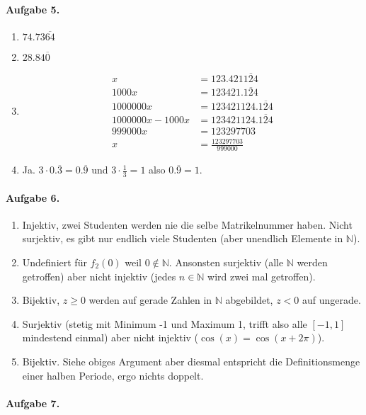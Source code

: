 \documentclass{article}
\begin{document}
\paragraph{Aufgabe 5.}
\begin{enumerate}
    \item $74.73\overline{64}$
    \item $28.84\overline{0}$
    \item \begin{align*}
        x &= 123.421\overline{124} \\
        1000x &= 123421.\overline{124} \\
        1000000x &= 123421124.\overline{124} \\
        1000000x - 1000x &= 123421124.\overline{124} \\
        999000x &= 123297703 \\
        x &= \frac{123297703}{999000}
    \end{align*}
    \item Ja. $3 \cdot 0.\overline{3} = 0.\overline{9}$ und $3 \cdot \frac{1}{3} = 1$ also $0.\overline{9} = 1$.
\end{enumerate}

\paragraph{Aufgabe 6.} \begin{enumerate}
    \item Injektiv, zwei Studenten werden nie die selbe Matrikelnummer haben. Nicht surjektiv, es gibt nur endlich viele Studenten (aber unendlich Elemente in $\mathbb{N}$).
    \item Undefiniert für $f_2(0)$ weil $0 \not\in \mathbb{N}$. Ansonsten surjektiv (alle $\mathbb{N}$ werden getroffen) aber nicht injektiv (jedes $n \in \mathbb{N}$ wird zwei mal getroffen).
    \item Bijektiv, $z \geq 0$ werden auf gerade Zahlen in $\mathbb{N}$ abgebildet, $z < 0$ auf ungerade.
    \item Surjektiv (stetig mit Minimum -1 und Maximum 1, trifft also alle $[-1, 1]$ mindestend einmal) aber nicht injektiv ($\cos(x) = \cos(x + 2\pi)$).
    \item Bijektiv. Siehe obiges Argument aber diesmal entspricht die Definitionsmenge einer halben Periode, ergo nichts doppelt.
\end{enumerate}

\paragraph{Aufgabe 7.}
\end{document}
